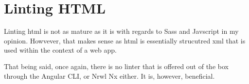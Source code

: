 \maketitle{}
\section{ Linting HTML }

Linting html is not as mature as it is with regards to Sass and Javscript in my
opinion. Howvever, that makes sense as html is essentially strucutred xml that
is used within the context of a web app.

That being said, once again, there is no linter that is offered out of the box
through the Angular CLI, or Nrwl Nx either. It is, however, beneficial.

